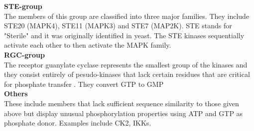 \documentclass[a4paper, 11pt]{article}
\begin{document}
\textbf{STE-group}\\
The members of this group are classified into three major families. They include STE20 (MAPK4), STE11 (MAPK3) and STE7 (MAP2K).  STE stands for "Sterile" and it was originally identified in yeast. The STE kinases sequentially activate each other to then activate the MAPK family.\\

\textbf{RGC-group}\\
The receptor guanylate cyclase represents the smallest group of the kinases and they consist entirely of pesudo-kinases that lack certain residues that are critical for phosphate transfer \cite{manning2002protein}. They convert GTP to GMP\\

\textbf{Others}\\
These include members that lack sufficient sequence similarity to those given above but display unusual phosphorylation properties using ATP and GTP as phosphate donor. Examples include CK2, IKKs.\\
\end{document}
